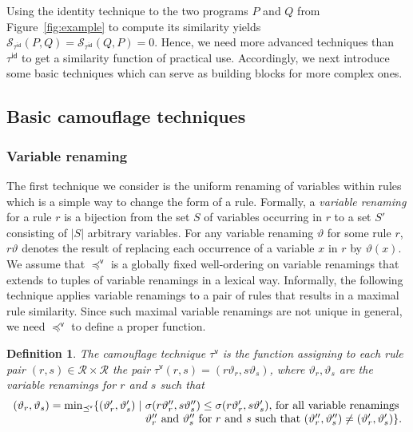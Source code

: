 \documentclass{tlp}
\newcommand{\preceqv}{\preceq^\mathsf{v}}
\newcommand{\camouv}{\tau^\mathsf{v}}
\newcommand{\subst}{\vartheta}
\newcommand{\rules}{\mathcal{R}}
\newcommand{\identity}{\tau^{\mathsf{id}}}
\newcommand{\rulesim}[2]{\sigma({#1},{#2})}
\newcommand{\progsim}[3]{\mathcal{S}_{#3}({#1},{#2})}
\newtheorem{definition}{Definition}
\begin{document}
Using the  identity technique to the two programs $P$ and $Q$ from
Figure~\ref{fig:example} to compute its similarity yields
$\progsim{P}{Q}{\identity} = \progsim{Q}{P}{\identity} = 0$. 
Hence, we need more advanced techniques than
$\identity$ to get a similarity function of practical use. 
Accordingly, we next introduce some basic techniques which can serve as building blocks for more complex ones.

\subsection{Basic camouflage techniques}\label{subsec:techniques}

\subsubsection{Variable renaming}

The first technique we consider is the uniform renaming of variables within rules which
is a  simple way to change the form of a rule. 
Formally, a \emph{variable renaming} for a rule $r$ is a bijection 
from the set $S$ of variables occurring in $r$ to a set $S'$ consisting of $|S|$ arbitrary variables.
For any variable renaming $\subst$  for some rule $r$, $r\subst$ denotes the result of 
replacing each occurrence of a variable $x$ in $r$ by $\subst(x)$. 
We assume that $\preceqv$ is a globally fixed well-ordering on variable renamings
that  extends to tuples of variable renamings in a lexical way.
Informally, the following technique applies variable renamings to a pair of rules that results in a maximal 
rule similarity. Since such maximal variable renamings are not unique in general, we need  $\preceqv$ to define
a proper function.

\begin{definition}\label{def:varrenaming}
The camouflage technique $\camouv$ is the function assigning to
each rule pair $(r,s)\in \rules\times\rules$ the pair
$\camouv(r, s) = (r\subst_{r}, s\subst_{s})$,
where $\subst_{r},\subst_{s}$ are the variable renamings for $r$ and $s$ such that
\[
\begin{array}{r@{~}l}
(\subst_{r},\subst_{s})=\mathrm{min}_{\preceqv}\{(\subst_{r}',\subst_{s}')\mid & \rulesim{r\subst_{r}''}{s\subst_{s}''} \leq \rulesim{r\subst_{r}'}{s\subst_{s}'}\mbox{, for all variable renamings}\\
&\mbox{$\subst_r''$ and $\subst_s''$ for $r$ and $s$ such that }(\subst_{r}'', \subst_{s}'')  \neq (\subst_{r}', \subst_{s}')\}.
\end{array}
\]
\end{definition}
\end{document}
